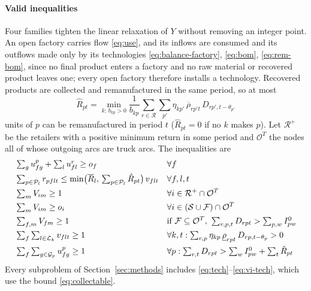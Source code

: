 \documentclass[review,11pt,nonatbib]{elsarticle}
\theoremstyle{remark}
\begin{document}
\paragraph{Valid inequalities} Four families tighten the linear relaxation of $Y$ without removing an integer point. An open factory carries flow \eqref{eq:use}, and its inflows are consumed and its outflows made only by its technologies \eqref{eq:balance-factory}, \eqref{eq:bom}, \eqref{eq:rem-bom}, since no final product enters a factory and no raw material or recovered product leaves one; every open factory therefore installs a technology. Recovered products are collected and remanufactured in the same period, so at most
\begin{equation}\label{eq:collectable}
\hat{R}_{pt} = \min_{k:\, b_{kp} > 0} \frac{1}{b_{kp}} \sum_{r \in \mathcal{R}} \sum_{p'} \eta_{kp'}\, \overline{\rho}_{rp't}\, D_{rp',t-\theta_{p'}}
\end{equation}
units of $p$ can be remanufactured in period $t$ ($\hat{R}_{pt} = 0$ if no $k$ makes $p$). Let $\mathcal{R}^{+}$ be the retailers with a positive minimum return in some period and $\mathcal{O}^{T}$ the nodes all of whose outgoing arcs are truck arcs. The inequalities are
\begin{align}
& \textstyle\sum_g u^{p}_{fg} + \sum_l u^{r}_{fl} \ge o_f && \forall f \label{eq:tech}\\
& \textstyle\sum_{p \in \mathcal{P}_l} r_{pflt} \le \min\bigl( \overline{R}_l,\, \sum_{p \in \mathcal{P}_l} \hat{R}_{pt} \bigr)\, v_{flt} && \forall f, l, t \label{eq:vi-rem}\\
& \textstyle\sum_{m} V_{im} \ge 1 && \forall i \in \mathcal{R}^{+} \cap \mathcal{O}^{T} \notag\\
& \textstyle\sum_{m} V_{im} \ge o_i && \forall i \in (\mathcal{S} \cup \mathcal{F}) \cap \mathcal{O}^{T} \notag\\
& \textstyle\sum_{f, m} V_{fm} \ge 1 && \text{if } \mathcal{F} \subseteq \mathcal{O}^{T},\ \textstyle\sum_{r,p,t} D_{rpt} > \sum_{p,w} I^0_{pw} \label{eq:vi-truck}\\
& \textstyle\sum_{f} \sum_{l \in \mathcal{L}_k} v_{flt} \ge 1 && \forall k, t: \textstyle\sum_{r,p} \eta_{kp}\, \underline{\rho}_{rpt}\, D_{rp,t-\theta_p} > 0 \notag\\
& \textstyle\sum_{f} \sum_{g \in \mathcal{G}_p} u^{p}_{fg} \ge 1 && \forall p: \textstyle\sum_{r,t} D_{rpt} > \sum_w I^0_{pw} + \sum_t \hat{R}_{pt} \label{eq:vi-tech}
\end{align}
Every subproblem of Section~\ref{sec:methods} includes \eqref{eq:tech}--\eqref{eq:vi-tech}, which use the bound \eqref{eq:collectable}.
\end{document}
